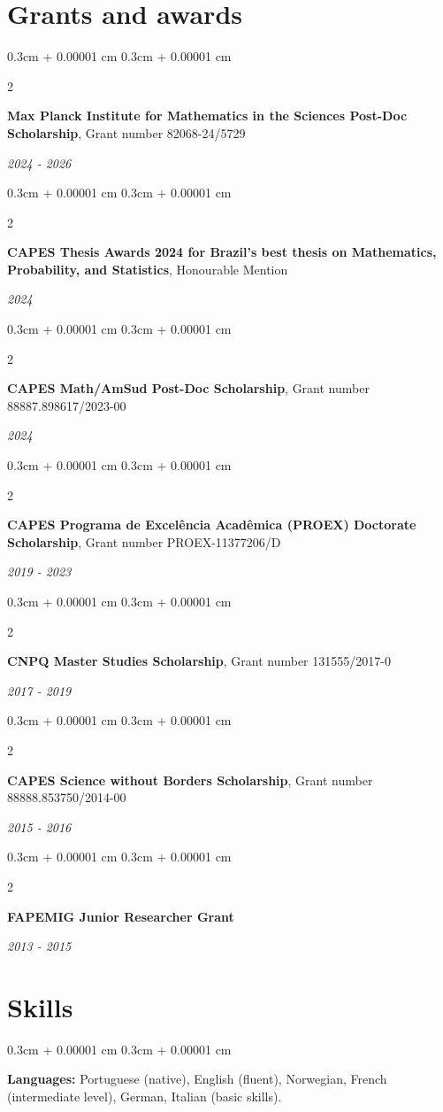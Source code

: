 \documentclass[10pt, letterpaper]{article}
\newenvironment{onecolentry}{
    \begin{adjustwidth}{
        0.3cm + 0.00001 cm
    }{
        0.3cm + 0.00001 cm
    }
}{
    \end{adjustwidth}
} %
\newenvironment{twocolentry}[2][]{
    \onecolentry
    \def\secondColumn{#2}
    \setcolumnwidth{\fill, 5 cm}
    \begin{paracol}{2}
    \small 
}{
    \switchcolumn \raggedleft \secondColumn
    \end{paracol}
    \endonecolentry
} %
\begin{document}
    \section{Grants and awards}
    \begin{twocolentry}{\textit{2024 - 2026}}
        \textbf{Max Planck Institute for Mathematics in the Sciences Post-Doc Scholarship}, Grant number 82068-24/5729
    \end{twocolentry} \vspace{0.1cm}
    
    \begin{twocolentry}{\textit{2024}}
        \textbf{CAPES Thesis Awards 2024 for Brazil's best thesis on Mathematics, Probability, and Statistics}, Honourable Mention 
    \end{twocolentry} \vspace{0.1cm}
    
    \begin{twocolentry}{\textit{2024}}
        \textbf{CAPES Math/AmSud Post-Doc Scholarship}, Grant number 88887.898617/2023-00
    \end{twocolentry} \vspace{0.1cm}
    
    \begin{twocolentry}{\textit{2019 - 2023}}
        \textbf{CAPES Programa de Excelência Acadêmica (PROEX) Doctorate Scholarship}, Grant number PROEX-11377206/D
    \end{twocolentry} \vspace{0.1cm}
    
    \begin{twocolentry}{\textit{2017 - 2019}}
        \textbf{CNPQ Master Studies Scholarship}, Grant number 131555/2017-0
    \end{twocolentry} \vspace{0.1cm}
    
    \begin{twocolentry}{\textit{2015 - 2016}}
        \textbf{CAPES Science without Borders Scholarship}, Grant number 88888.853750/2014-00
    \end{twocolentry} \vspace{0.1cm}
    
    \begin{twocolentry}{\textit{2013 - 2015}}
        \textbf{FAPEMIG Junior Researcher Grant}
    \end{twocolentry} \vspace{0.1cm}

    \section{Skills}
    \begin{onecolentry}
        \textbf{Languages:} Portuguese (native), English (fluent), Norwegian, French (intermediate level), German, Italian (basic skills).
    \end{onecolentry} \vspace{0.1cm}
    
\end{document}
